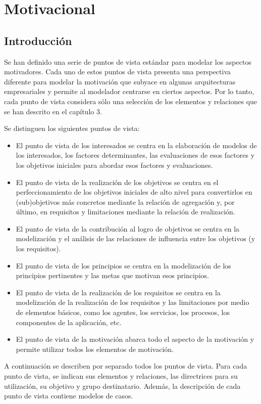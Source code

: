 \chapter{Motivacional}
\section{Introducción}
Se han definido una serie de puntos de vista estándar para modelar los aspectos motivadores. Cada uno de estos puntos de vista presenta una perspectiva diferente para modelar la motivación que subyace en algunas arquitecturas empresariales y permite al modelador centrarse en ciertos aspectos. Por lo tanto, cada punto de vista considera sólo una selección de los elementos y relaciones que se han descrito en el capítulo 3.

Se distinguen los siguientes puntos de vista:

\begin{itemize}
	\item El punto de vista de los interesados se centra en la elaboración de modelos de los interesados, los factores determinantes, las evaluaciones de esos factores y los objetivos iniciales para abordar esos factores y evaluaciones.
	\item El punto de vista de la realización de los objetivos se centra en el perfeccionamiento de los objetivos iniciales de alto nivel para convertirlos en (sub)objetivos más concretos mediante la relación de agregación y, por último, en requisitos y limitaciones mediante la relación de realización.
	\item El punto de vista de la contribución al logro de objetivos se centra en la modelización y el análisis de las relaciones de influencia entre los objetivos (y los requisitos).
	\item El punto de vista de los principios se centra en la modelización de los principios pertinentes y las metas que motivan esos principios.
	\item El punto de vista de la realización de los requisitos se centra en la modelización de la realización de los requisitos y las limitaciones por medio de elementos básicos, como los agentes, los servicios, los procesos, los componentes de la aplicación, etc.
	\item El punto de vista de la motivación abarca todo el aspecto de la motivación y permite utilizar todos los elementos de motivación.
\end{itemize}

A continuación se describen por separado todos los puntos de vista. Para cada punto de vista, se indican sus elementos y relaciones, las directrices para su utilización, su objetivo y grupo destinatario. Además, la descripción de cada punto de vista contiene modelos de casos.
\newpage

